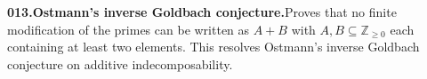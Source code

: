 \documentclass[11pt,a4paper]{article}
\begin{document}
  \par \begin{minipage}{\linewidth}
  \fontsize{10.5}{12.6}\selectfont\RaggedRight
  \hypertarget{result 013}{}
  {\bfseries\textcolor{muted}{013.}\enspace Ostmann's inverse Goldbach conjecture.}\enspace Proves that no finite modification of the primes can be written as $A+B$ with $A,B\subseteq\mathbb Z_{\ge0}$ each containing at least two elements. This resolves Ostmann's inverse Goldbach conjecture on additive indecomposability.\par
  \end{minipage}\par\vspace{5pt}
\end{document}
